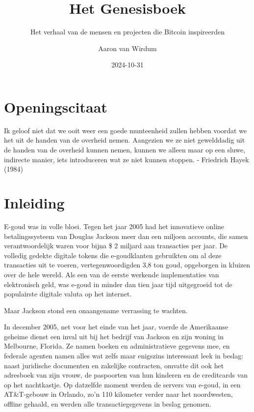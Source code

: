 \documentclass[
  a5paper,
  smalldemyvopaper,11pt,twoside,onecolumn,openright,extrafontsizes,
hidelinks]{memoir}
\title{Het Genesisboek}
\subtitle{Het verhaal van de mensen en projecten die Bitcoin
inspireerden}
\author{Aaron van Wirdum}
\date{2024-10-31}
\renewenvironment{quote}%
               {\list{}{\rightmargin=.3cm\leftmargin=.3cm}%
                \itshape \item[]}%
               {\endlist}
\renewcommand*\contentsname{Inhoudsopgave}
\newcommand\contentsname{Inhoudsopgave}
\begin{document}
\frontmatter
\maketitle

\renewcommand*\contentsname{Inhoudsopgave}
{
\setcounter{tocdepth}{0}
\tableofcontents*
}


\chapter*{Openingscitaat}\label{openingscitaat}


\begin{quote}
Ik geloof niet dat we ooit weer een goede munteenheid zullen hebben
voordat we het uit de handen van de overheid nemen. Aangezien we ze niet
gewelddadig uit de handen van de overheid kunnen nemen, kunnen we alleen
maar op een sluwe, indirecte manier, iets introduceren wat ze niet
kunnen stoppen. - Friedrich Hayek (1984)
\end{quote}

\mainmatter


\chapter*{Inleiding}\label{inleiding}


E-goud was in volle bloei. Tegen het jaar 2005 had het innovatieve
online betalingssysteem van Douglas Jackson meer dan een miljoen
accounts, die samen verantwoordelijk waren voor bijna \$ 2 miljard aan
transacties per jaar. De volledig gedekte digitale tokens die
e-goudklanten gebruikten om al deze transacties uit te voeren,
vertegenwoordigden 3,8 ton goud, opgeborgen in kluizen over de hele
wereld. Als een van de eerste werkende implementaties van elektronisch
geld, was e-goud in minder dan tien jaar tijd uitgegroeid tot de
populairste digitale valuta op het internet.

Maar Jackson stond een onaangename verrassing te wachten.

In december 2005, net voor het einde van het jaar, voerde de Amerikaanse
geheime dienst een inval uit bij het bedrijf van Jackson en zijn woning
in Melbourne, Florida. Ze namen boeken en administratieve gegevens mee,
en federale agenten namen alles wat zelfs maar enigszins interessant
leek in beslag: naast juridische documenten en zakelijke contracten,
omvatte dit ook het adresboek van zijn vrouw, de paspoorten van hun
kinderen en de creditcards van op het nachtkastje. Op datzelfde moment
werden de servers van e-goud, in een AT\&T-gebouw in Orlando, zo'n 110
kilometer verder naar het noordwesten, offline gehaald, en werden alle
transactiegegevens in beslag genomen.
\end{document}
